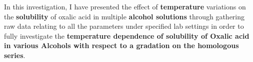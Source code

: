 {In this investigation, I have presented the effect of \textbf{temperature} variations on the \textbf{solubility} of oxalic acid in multiple \textbf{alcohol solutions} through gathering raw data relating to all the parameters under specified lab settings in order to fully investigate the \textbf{temperature dependence of solubility of Oxalic acid in various Alcohols with respect to a gradation on the homologous series}.}



